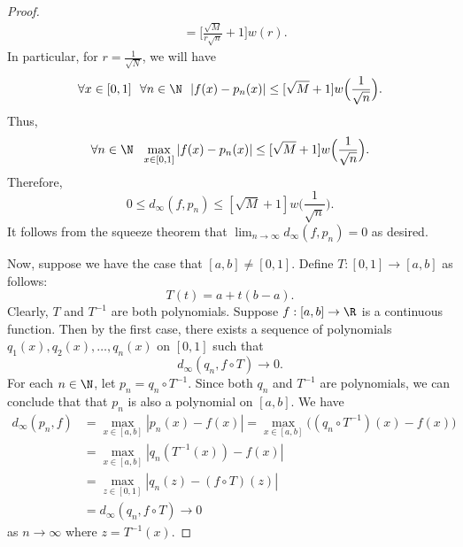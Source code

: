 \begin{proof}
\begin{align*}
                              &= \Big[ \frac{ \sqrt{ M }  }{ r \sqrt{ n }  }  + 1 \Big] w(r). 
    \end{align*}
    In particular, for \( r = \frac{ 1  }{ \sqrt{  N  }  }  \), we will have 
    \[  \forall x \in [0,1] \ \ \forall n \in \N \ \ | f(x) - {p}_{n}(x)  | \leq [\sqrt{  M  }  + 1 ] w \Big(  \frac{ 1 }{ \sqrt{ n }  }  \Big). \] 
    Thus, 
    \[  \forall n \in \N  \ \ \max_{x \in [0,1]} | f(x) - {p}_{n}(x)  |  \leq [\sqrt{ M  }  + 1 ] w  \Big(  \frac{ 1 }{ \sqrt{ n }  }  \Big). \]
    Therefore, 
    \[  0 \leq {d}_{\infty }(f, {p}_{n}) \leq [\sqrt{ M }  + 1] w \Big(  \frac{ 1 }{ \sqrt{ n }  }  \Big). \]
    It follows from the squeeze theorem that \( \lim_{ n \to \infty  }  {d}_{\infty }(f,{p}_{n}) = 0 \) as desired.

    Now, suppose we have the case that \( [a,b] \neq [0,1] \). Define \( T: [0,1] \to [a,b] \) as follows: 
    \[  T(t) = a + t(b-a). \]
    Clearly, \( T  \) and \( T^{-1} \) are both polynomials. Suppose \( f:[a,b] \to \R  \) is a continuous function. Then by the first case, there exists a sequence of polynomials \( {q}_{1}(x), {q}_{2}(x), \dots, {q}_{n}(x) \) on \( [0,1] \) such that 
    \[  {d}_{\infty }({q}_{n}, f \circ T) \to 0.   \]
    For each \( n \in \N  \), let \( {p}_{n} = {q}_{n} \circ T^{-1} \). Since both \( {q}_{n}  \) and \( T^{-1} \) are polynomials, we can conclude that that \( {p}_{n} \) is also a polynomial on \( [a,b] \). We have
    \begin{align*}
        {d}_{\infty }({p}_{n},f) &= \max_{x \in [a,b]} | {p}_{n}(x) - f(x)  |  = \max_{x \in [a,b]} \Big(  ({q}_{n} \circ T^{-1}) (x) - f(x) \Big) \\
                                 &= \max_{x \in [a,b]} | {q}_{n} (T^{-1}(x)) - f(x) |  \\
                                 &= \max_{z \in [0,1]} | {q}_{n}(z) - (f \circ T)(z)  |  \\
                                 &= {d}_{\infty }({q}_{n}, f \circ T) \to 0 
    \end{align*}
    as \( n \to \infty  \) where \( z = T^{-1}(x) \).
\end{proof}
